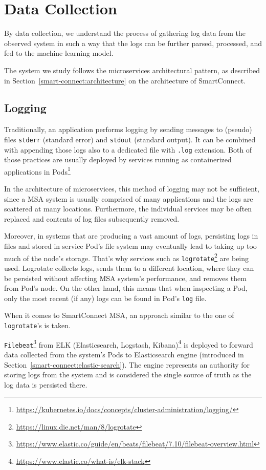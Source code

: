 \section{Data Collection}
\label{data_collection}
By data collection, we understand the process of gathering log data from the observed system in such a way that the logs can be further parsed, processed, and fed to the machine learning model.

The system we study follows the microservices architectural pattern, as described in Section~\ref{smart-connect:architecture} on the architecture of SmartConnect.\\

\subsection{Logging}

Traditionally, an application performs logging by sending messages to
(pseudo) files \texttt{stderr} (standard error) and \texttt{stdout} (standard output). It can be combined with appending those logs also to a dedicated file with \texttt{.log} extension. Both of those practices are usually deployed by services running as containerized applications in Pods\footnote{\url{https://kubernetes.io/docs/concepts/cluster-administration/logging/}}

In the architecture of microservices, this method of logging may not be sufficient,  since a MSA system is usually comprised of many applications and the logs are scattered at many locations. Furthermore, the individual services may be often replaced and contents of log files subsequently removed.

Moreover, in systems that are producing a vast amount of logs, persisting logs in files and stored in service Pod's file system may eventually lead to taking up too much of the node's storage. That's why services such as \texttt{logrotate}\footnote{\url{https://linux.die.net/man/8/logrotate}} are being used. Logrotate collects logs, sends them to a different location, where they can be persisted without affecting MSA system's performance, and removes them from Pod's node. 
On the other hand, this means that when inspecting a Pod, only the most recent (if any) logs can be found in Pod's \texttt{log} file.

When it comes to SmartConnect MSA, an approach similar to the one of \texttt{logrotate}'s is taken.

\texttt{Filebeat}\footnote{\url{https://www.elastic.co/guide/en/beats/filebeat/7.10/filebeat-overview.html}} from ELK (Elasticsearch, Logstash, Kibana)\footnote{\url{https://www.elastic.co/what-is/elk-stack}} is deployed to forward data collected from the system's Pods to Elasticsearch engine (introduced in Section~\ref{smart-connect:elastic-search}). 
The engine represents an authority for storing logs from the system and is considered the single source of truth as the log data is persisted there.

